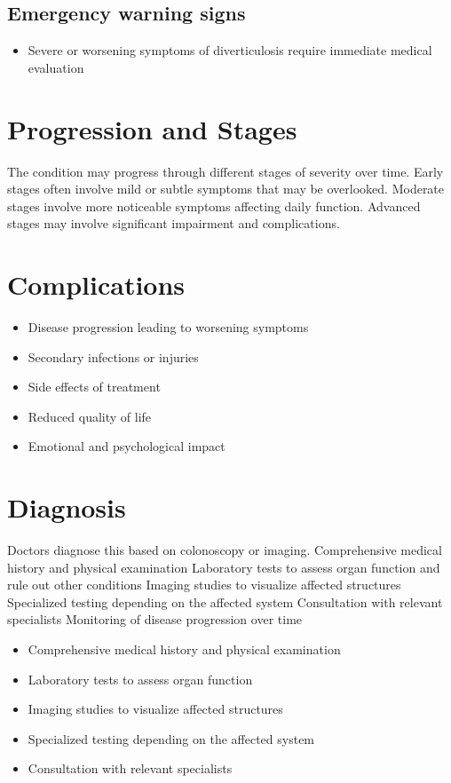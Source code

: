 \subsection{Emergency warning signs}
\begin{itemize}[noitemsep]
  \item Severe or worsening symptoms of diverticulosis require immediate medical evaluation
\end{itemize}
\section{Progression and Stages}
The condition may progress through different stages of severity over time. Early stages often involve mild or subtle symptoms that may be overlooked. Moderate stages involve more noticeable symptoms affecting daily function. Advanced stages may involve significant impairment and complications.
\section{Complications}
\begin{itemize}[noitemsep]
  \item Disease progression leading to worsening symptoms
  \item Secondary infections or injuries
  \item Side effects of treatment
  \item Reduced quality of life
  \item Emotional and psychological impact
\end{itemize}
\section{Diagnosis}
Doctors diagnose this based on colonoscopy or imaging. Comprehensive medical history and physical examination Laboratory tests to assess organ function and rule out other conditions Imaging studies to visualize affected structures Specialized testing depending on the affected system Consultation with relevant specialists Monitoring of disease progression over time

\begin{itemize}[noitemsep]
  \item Comprehensive medical history and physical examination
  \item Laboratory tests to assess organ function
  \item Imaging studies to visualize affected structures
  \item Specialized testing depending on the affected system
  \item Consultation with relevant specialists
\end{itemize}
